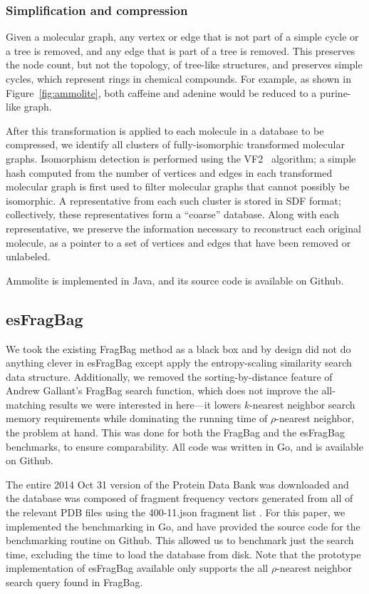 \documentclass[review,preprint,12pt]{elsarticle}
\renewcommand{\cite}{\citep} %
\theoremstyle{definition}
\theoremstyle{remark}
\begin{document}
\subsubsection{Simplification and compression}

Given a molecular graph, any vertex or edge that is not part of a simple cycle or a tree is removed, and any edge that is part
of a tree is removed.
This preserves the node count, but not the topology, of tree-like structures, and preserves simple cycles,
which represent rings in chemical compounds.
For example, as shown in Figure~\ref{fig:ammolite}, both caffeine and adenine would be reduced to a purine-like graph.

After this transformation is applied to each molecule in a database to be compressed, we identify all clusters
of fully-isomorphic transformed molecular graphs.
Isomorphism detection is performed using the VF2~\cite{cordella2001improved} 
algorithm; a simple hash computed from the
number of vertices and edges in each transformed molecular graph is first used 
to filter molecular graphs that cannot possibly be isomorphic.
A representative from each such cluster is stored in SDF format; collectively, these representatives form a 
``coarse'' database.
Along with each representative, we preserve the information necessary to reconstruct each original molecule,
as a pointer to a set of vertices and edges that have been removed or unlabeled.

Ammolite is implemented in Java, and its source code is available on Github.

\subsection{esFragBag}
We took the existing FragBag method as a black box and by design did not do anything clever in esFragBag except apply the entropy-scaling similarity search data structure.
Additionally, we removed the sorting-by-distance feature of Andrew Gallant's 
FragBag search function, which does not improve the all-matching results we 
were interested in here---it lowers $k$-nearest neighbor search memory 
requirements while dominating the running time of $\rho$-nearest neighbor, the 
problem at hand.
This was done for both the FragBag and the esFragBag benchmarks, to ensure comparability.
All code was written in Go, and is available on Github.

The entire 2014 Oct 31 version of the Protein Data Bank was downloaded and the 
database was composed of fragment frequency vectors generated from all of the 
relevant PDB files using the 400-11.json fragment list \cite{budowski2010fragbag}.
For this paper, we implemented the benchmarking in Go, and have provided the 
source code for the benchmarking routine on Github.
This allowed us to benchmark just the search time, excluding the time to load the database from disk.
Note that the prototype implementation of esFragBag available only supports the 
all $\rho$-nearest neighbor search query found in FragBag.


%

\end{document}
